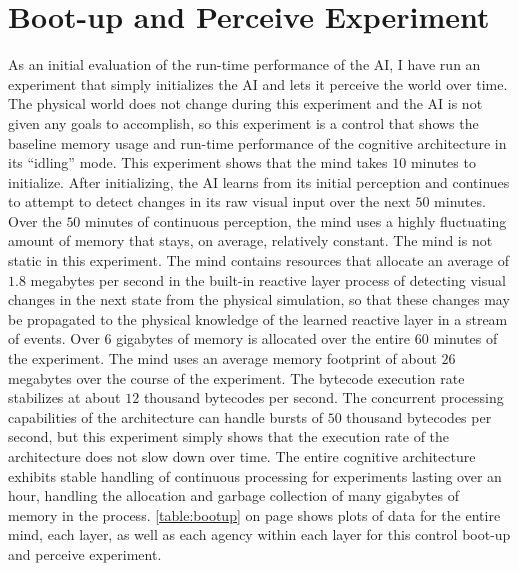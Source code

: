 \section{Boot-up and Perceive Experiment}

As an initial evaluation of the run-time performance of the AI, I have
run an experiment that simply initializes the AI and lets it perceive
the world over time.  The physical world does not change during this
experiment and the AI is not given any goals to accomplish, so this
experiment is a control that shows the baseline memory usage and
run-time performance of the cognitive architecture in its ``idling''
mode.  This experiment shows that the mind takes $10$ minutes to
initialize.  After initializing, the AI learns from its initial
perception and continues to attempt to detect changes in its raw
visual input over the next $50$ minutes.  Over the $50$ minutes of
continuous perception, the mind uses a highly fluctuating amount of
memory that stays, on average, relatively constant.  The mind is not
static in this experiment.  The mind contains resources that allocate
an average of $1.8$ megabytes per second in the built-in reactive
layer process of detecting visual changes in the next state from the
physical simulation, so that these changes may be propagated to the
physical knowledge of the learned reactive layer in a stream of
events.  Over $6$ gigabytes of memory is allocated over the entire
$60$ minutes of the experiment.  The mind uses an average memory
footprint of about $26$ megabytes over the course of the experiment.
The bytecode execution rate stabilizes at about $12$ thousand
bytecodes per second.  The concurrent processing capabilities of the
architecture can handle bursts of $50$ thousand bytecodes per second,
but this experiment simply shows that the execution rate of the
architecture does not slow down over time.  The entire cognitive
architecture exhibits stable handling of continuous processing for
experiments lasting over an hour, handling the allocation and garbage
collection of many gigabytes of memory in the process.
\autoref{table:bootup} on page \pageref{table:bootup} shows plots of
data for the entire mind, each layer, as well as each agency within
each layer for this control boot-up and perceive experiment.

